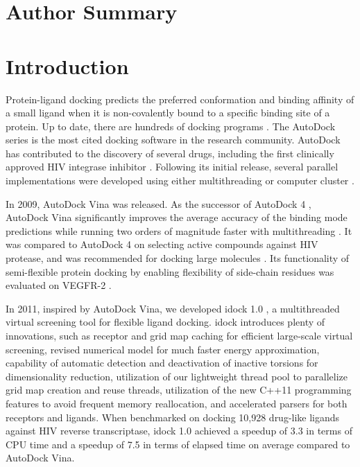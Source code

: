 \documentclass[10pt]{article}
\begin{document}
\section*{Author Summary}

\section*{Introduction}
Protein-ligand docking predicts the preferred conformation and binding affinity of a small ligand when it is non-covalently bound to a specific binding site of a protein. Up to date, there are hundreds of docking programs \cite{493,922}. The AutoDock series is the most cited docking software in the research community. AutoDock has contributed to the discovery of several drugs, including the first clinically approved HIV integrase inhibitor \cite{1169}. Following its initial release, several parallel implementations were developed using either multithreading or computer cluster \cite{115,560,782}.

In 2009, AutoDock Vina \cite{595} was released. As the successor of AutoDock 4 \cite{596}, AutoDock Vina significantly improves the average accuracy of the binding mode predictions while running two orders of magnitude faster with multithreading \cite{595}. It was compared to AutoDock 4 on selecting active compounds against HIV protease, and was recommended for docking large molecules \cite{556}. Its functionality of semi-flexible protein docking by enabling flexibility of side-chain residues was evaluated on VEGFR-2 \cite{1084}.%

In 2011, inspired by AutoDock Vina, we developed idock 1.0 \cite{1153}, a multithreaded virtual screening tool for flexible ligand docking. idock introduces plenty of innovations, such as receptor and grid map caching for efficient large-scale virtual screening, revised numerical model for much faster energy approximation, capability of automatic detection and deactivation of inactive torsions for dimensionality reduction, utilization of our lightweight thread pool to parallelize grid map creation and reuse threads, utilization of the new C++11 programming features to avoid frequent memory reallocation, and accelerated parsers for both receptors and ligands. When benchmarked on docking 10,928 drug-like ligands against HIV reverse transcriptase, idock 1.0 achieved a speedup of 3.3 in terms of CPU time and a speedup of 7.5 in terms of elapsed time on average compared to AutoDock Vina.
\end{document}
